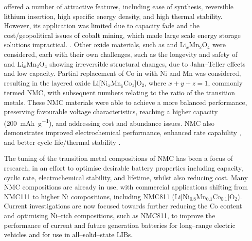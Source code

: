 \documentclass[journal=jacsat,manuscript=article]{achemso}
\begin{document}
 offered a number of attractive features, including ease of synthesis, reversible lithium insertion, high specific energy density, and high thermal stability.\cite{gibbard1989high,plichta1989improved,noh2013comparison} 
However, its application was limited due to capacity fade and the cost/geopolitical issues of cobalt mining, which made large scale energy storage solutions impractical. \cite{mo_impact_2018,Banza2009}. 
Other oxide materials, such as  and Li$_x$Mn$_2$O$_4$ were considered, each with their own challenges, such as the longevity and safety of \cite{min_comparative_2016} and Li$_x$Mn$_2$O$_4$ showing irreversible structural changes, due to Jahn--Teller effects and low capacity.\cite{tian_performance_2018} Partial replacement of Co in  with Ni and Mn was considered, resulting in the layered oxide Li[Ni$_x$Mn$_y$Co$_z$]O$_2$, where $x+y+z=1$, commonly termed NMC, with subsequent numbers relating to the ratio of the transition metals.\cite{paulsen2000o2,paulsen20002, lu2001layered,rozier_review_2015} 
These NMC materials were able to achieve a more balanced performance, preserving favourable voltage characteristics, reaching a higher capacity (\SI{200}{mAh.g^{-1}}), and addressing cost and abundance issues. \cite{sun_electronic_2017,larcher2015towards,ohzuku2001layered} 
NMC also demonstrates improved electrochemical performance, enhanced rate capability \cite{noh2013comparison,dahn1991rechargeable}, and better cycle life/thermal stability \cite{kim2006synthesis,armstrong1996synthesis}.

The tuning of the transition metal compositions of NMC has been a focus of research, in an effort to optimise desirable battery properties including capacity, cyclic rate, electrochemical stability, and lifetime, whilst also reducing cost.\cite{duan2019insights}
Many NMC compositions are already in use, with commercial applications shifting from NMC111 to higher Ni compositions, including NMC811 (Li[Ni$_{0.8}$Mn$_{0.1}$Co$_{0.1}$]O$_2$).\cite{zhang2018structural}
Current investigations are now focused towards further reducing the Co content and optimising Ni--rich compositions, such as NMC811, to improve the performance of current and future generation batteries for long--range electric vehicles\cite{azevedo2018mining} and for use in all--solid--state LIBs.\cite{Myung2017,ohzuku2001layered,lu2001layered,belharouak2003li,kim2014unexpected,sun_electronic_2017}
\end{document}
